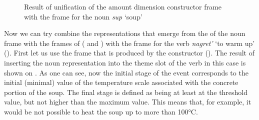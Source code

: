 \begin{figure}
\centering
{}
\caption{Result of unification of the amount dimension constructor frame with the frame for the noun \textit{sup} `soup' \label{frame:soup:amount}}
\end{figure}

Now we can try combine the representations that emerge from the  of the noun frame with the  frames of  ( and ) with the frame for the verb \textit{nagret'} `to warm up' (). First let us use the frame that is produced by the  constructor (). The result of inserting the noun representation into the theme slot of the verb in this case is shown on . As one can see, now the initial stage of the event corresponds to the initial (minimal) value of the temperature scale associated with the concrete portion of the soup. The final stage is defined as being at least at the threshold value, but not higher than the maximum value. This means that, for example, it would be not possible to heat the soup up to more than 100°C. 

